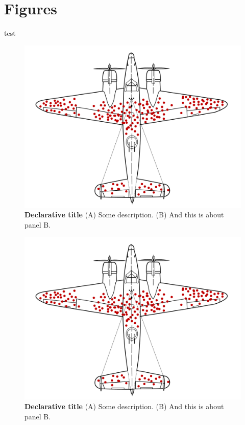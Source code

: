 \pagebreak
\section*{Figures}
test
\begin{figure}[h!]
    \centering
    \includegraphics[width=1\linewidth]{figures/fig1.pdf}
    \caption{\textbf{Declarative title} (A) Some description. (B) And this is about panel B.}
    \label{fig:fig1}
  \end{figure}

\begin{figure}[h!]
    \centering
    \includegraphics[width=1\linewidth]{figures/fig2.pdf}
    \caption{\textbf{Declarative title} (A) Some description. (B) And this is about panel B.}
    \label{fig:fig2}
  \end{figure}


